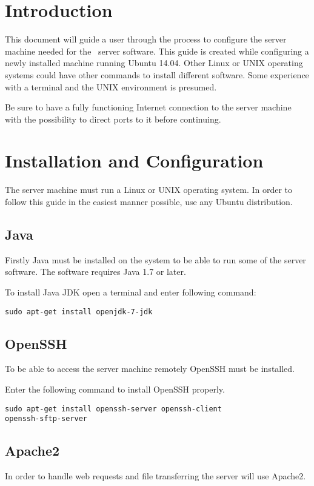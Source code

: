 \label{chap:exp_app_ubuntu}
\section{Introduction}
This document will guide a user through the process to configure the server machine needed for the \appName\ server software. This guide is created while configuring a newly installed machine running Ubuntu 14.04. Other Linux or UNIX operating systems could have other commands to install different software. Some experience with a terminal and the UNIX environment is presumed.

Be sure to have a fully functioning Internet connection to the server machine with the possibility to direct ports to it before continuing.

\section{Installation and Configuration}
The server machine must run a Linux or UNIX operating system. In order to follow this guide in the easiest manner 
possible, use any Ubuntu distribution. 

\subsection{Java}
Firstly Java must be installed on the system to be able to run some of the server software. The software requires Java 1.7 or later. 

To install Java JDK open a terminal and enter following command:
\begin{verbatim}
sudo apt-get install openjdk-7-jdk
\end{verbatim}

\subsection{OpenSSH}
To be able to access the server machine remotely OpenSSH must be installed.

Enter the following command to install OpenSSH properly.
\begin{verbatim}
sudo apt-get install openssh-server openssh-client
openssh-sftp-server
\end{verbatim}

\subsection{Apache2}\label{sec:exp_apache2}
In order to handle web requests and file transferring the server will use Apache2. 

